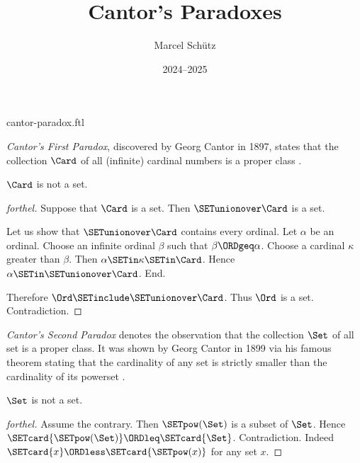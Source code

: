 \documentclass{article}
\title{Cantor's Paradoxes}
\author{Marcel Schütz}
\date{2024--2025}
\begin{document}
\begin{smodule}{cantor-paradox.ftl}
\maketitle


\noindent \emph{Cantor's First Paradox}, discovered by Georg Cantor in 1897,
states that the collection $\Card$ of all (infinite) cardinal numbers is a
proper class \cite[chapter 156]{Cantor1991}.

\begin{theorem}[forthel,title=Cantor's First Paradox,id=cantor_paradox_1]
  $\Card$ is not a set.
\end{theorem}
\begin{proof}[forthel]
  Suppose that $\Card$ is a set.
  Then $\SETunionover \Card$ is a set.

  Let us show that $\SETunionover \Card$ contains every ordinal.
    Let $\alpha$ be an ordinal.
    Choose an infinite ordinal $\beta$ such that $\beta \ORDgeq \alpha$.
    Choose a cardinal $\kappa$ greater than $\beta$.
    Then $\alpha \SETin \kappa \SETin \Card$.
    Hence $\alpha \SETin \SETunionover \Card$.
  End.

  Therefore $\Ord \SETinclude \SETunionover \Card$.
  Thus $\Ord$ is a set.
  Contradiction.
\end{proof}

\emph{Cantor's Second Paradox} denotes the observation that the collection
$\Set$ of all set is a proper class.
It was shown by Georg Cantor in 1899 via his famous theorem stating that the
cardinality of any set is strictly smaller than the cardinality of its 
powerset \cite[chapter 163]{Cantor1991}.

\begin{theorem}[forthel,title=Cantor's Second Paradox,id=cantor_paradox_2]
  $\Set$ is not a set.
\end{theorem}
\begin{proof}[forthel]
  Assume the contrary.
  Then $\SETpow(\Set)$ is a subset of $\Set$.
  Hence $\SETcard{\SETpow(\Set)} \ORDleq \SETcard{\Set}$.
  Contradiction.
  Indeed $\SETcard{x} \ORDless \SETcard{\SETpow(x)}$ for any set $x$.
\end{proof}

\printbibliography
{}
\end{smodule}
\end{document}
